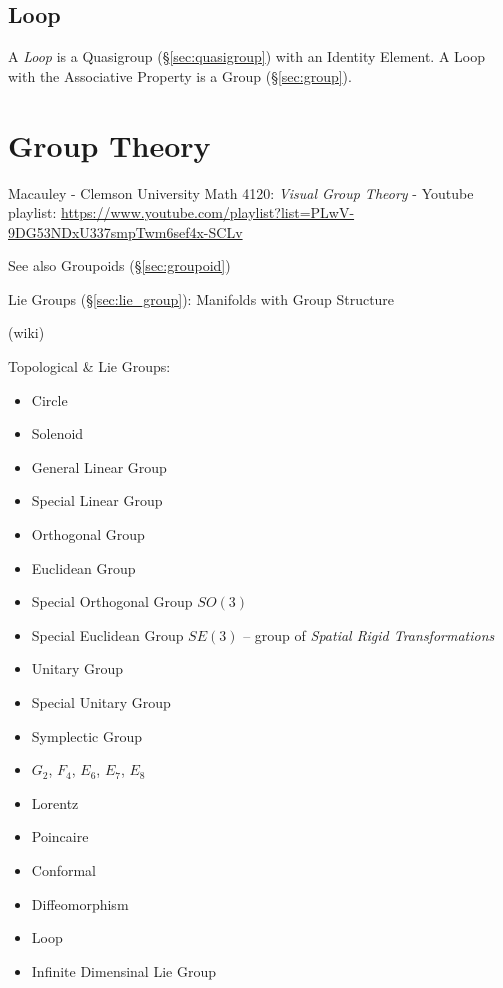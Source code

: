 \subsection{Loop}\label{sec:quasigroup_loop}

A \emph{Loop} is a Quasigroup (\S\ref{sec:quasigroup}) with an
Identity Element. A Loop with the Associative Property is a Group
(\S\ref{sec:group}).



\section{Group Theory}\label{sec:group_theory}

Macauley - Clemson University Math 4120: \emph{Visual Group Theory} - Youtube
playlist:
\url{https://www.youtube.com/playlist?list=PLwV-9DG53NDxU337smpTwm6sef4x-SCLv}

\fist See also Groupoids (\S\ref{sec:groupoid})

\fist Lie Groups (\S\ref{sec:lie_group}): Manifolds with Group Structure

(wiki)

Topological \& Lie Groups:
\begin{itemize}
  \item Circle
  \item Solenoid
  \item General Linear Group
  \item Special Linear Group
  \item Orthogonal Group
  \item Euclidean Group
  \item Special Orthogonal Group $SO(3)$
  \item Special Euclidean Group $SE(3)$ -- group of \emph{Spatial Rigid
    Transformations}
  \item Unitary Group
  \item Special Unitary Group
  \item Symplectic Group
  \item $G_2$, $F_4$, $E_6$, $E_7$, $E_8$
  \item Lorentz
  \item Poincaire
  \item Conformal
  \item Diffeomorphism
  \item Loop
  \item Infinite Dimensinal Lie Group
\end{itemize}

